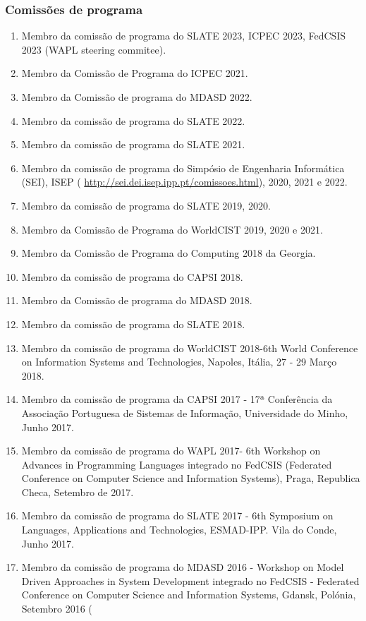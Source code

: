 \documentclass[11pt]{article}
\begin{document}
\subsubsection{Comissões de programa}
\begin{enumerate}
\item{Membro da comissão de programa do SLATE 2023, ICPEC 2023, FedCSIS 2023 (WAPL steering commitee).}
\item{Membro da Comissão de Programa do ICPEC 2021.}
\item{Membro da Comissão de programa do MDASD 2022.}
\item{Membro da comissão de programa do SLATE 2022.}
\item{Membro da comissão de programa do SLATE 2021.}
\item{Membro da comissão de programa do Simpósio de Engenharia Informática (SEI), ISEP (
\url{http://sei.dei.isep.ipp.pt/comissoes.html}), 2020, 2021 e 2022.}
\item{Membro da comissão de programa do SLATE 2019, 2020.}
\item{Membro da Comissão de Programa do WorldCIST 2019, 2020 e 2021.}
\item{Membro da Comissão de Programa do Computing 2018 da Georgia.}
\item{Membro da comissão de programa do CAPSI 2018.}
\item{Membro da Comissão de programa do MDASD 2018.}
\item{Membro da comissão de programa do SLATE 2018.}
\item{Membro da comissão de programa do WorldCIST 2018-6th World Conference on Information Systems and Technologies, Napoles, Itália, 27 - 29 Março 2018.}
\item{Membro da comissão de programa da CAPSI 2017 - 17ª Conferência da Associação Portuguesa de Sistemas de Informação, Universidade do Minho, Junho 2017. }
\item{Membro da comissão de programa do WAPL 2017- 6th Workshop on Advances in Programming Languages integrado no FedCSIS (Federated Conference on Computer Science and Information Systems), Praga, Republica Checa, Setembro de 2017.}
\item{Membro da comissão de programa do SLATE 2017 - 6th Symposium on Languages, Applications and Technologies, ESMAD-IPP. Vila do Conde, Junho 2017.}
\item{Membro da comissão de programa do MDASD 2016 - Workshop on Model Driven Approaches in System Development integrado no FedCSIS - Federated Conference on Computer Science and Information Systems, Gdansk, Polónia, Setembro 2016 (
}
\end{enumerate}
\end{document}
